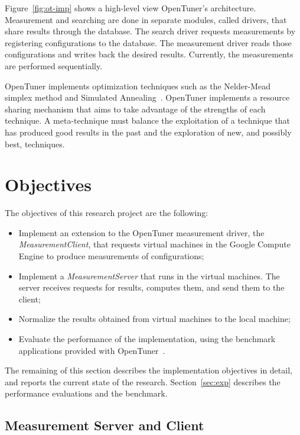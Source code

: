 \documentclass[a4paper, 12pt]{article}
\begin{document}
Figure~\ref{fig:ot-imp} shows a high-level view OpenTuner's architecture.
Measurement and searching are done in separate modules, called drivers,
that share results through the database. The search driver requests
measurements by registering configurations to the database. The measurement
driver reads those configurations and writes back the desired results.
Currently, the measurements are performed sequentially.

OpenTuner implements optimization techniques such as the
Nelder-Mead~\cite{nelder1965simplex} simplex
method and Simulated Annealing~\cite{kirkpatrick1983optimization}.
OpenTuner implements a resource sharing mechanism that aims to take
advantage of the strengths of each technique. A meta-technique
must balance the exploitation of a technique that has produced
good results in the past and the exploration of new, and possibly
best, techniques.

\section{Objectives} \label{sec:obj}

The objectives of this research project are the following:

\begin{itemize}
    \item Implement an extension to the OpenTuner measurement driver,
        the \emph{MeasurementClient}, that requests virtual
        machines in the Google Compute Engine to produce
        measurements of configurations;
    \item Implement a \emph{MeasurementServer} that runs
        in the virtual machines. The server receives
        requests for results, computes them, and send
        them to the client;
    \item Normalize the results obtained from virtual machines
        to the local machine;
    \item Evaluate the performance of the implementation,
        using the benchmark applications provided with
        OpenTuner~\cite{ansel2014opentuner}.
\end{itemize}

The remaining of this section describes the implementation objectives in
detail, and reports the current state of the research. Section~\ref{sec:exp}
describes the performance evaluations and the benchmark.

\subsection{Measurement Server and Client}
\end{document}
